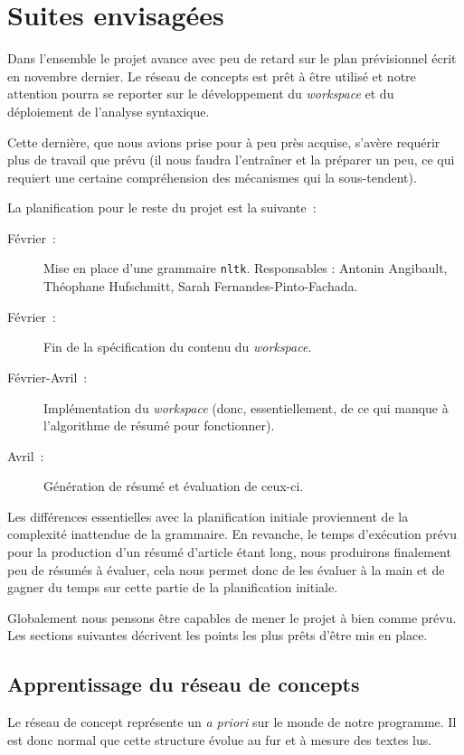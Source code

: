 \documentclass[a4paper,12pt]{article}
\newcommand{\pyt}[1]{\texttt{#1}}
\begin{document}
\section{Suites envisag\'ees}

Dans l'ensemble le projet avance avec peu de retard sur le plan prévisionnel écrit en novembre dernier. Le réseau de concepts est prêt à être utilisé et notre attention pourra se reporter sur le développement du \textit{workspace} et du déploiement de l'analyse syntaxique.

Cette dernière, que nous avions prise pour à peu près acquise, s'avère requérir plus de travail que prévu (il nous faudra l'entraîner et la préparer un peu, ce qui requiert une certaine compréhension des mécanismes qui la sous-tendent).

La planification pour le reste du projet est la suivante~:
\begin{description}
	\item[Février~: ]Mise en place d'une grammaire \pyt{nltk}. Responsables : Antonin Angibault, Théophane Hufschmitt, Sarah Fernandes-Pinto-Fachada.
	\item[Février~: ]Fin de la spécification du contenu du \textit{workspace}.
	\item[Février-Avril~: ]Implémentation du \textit{workspace} (donc, essentiellement, de ce qui manque à l'algorithme de résumé pour fonctionner).
	\item[Avril~: ]Génération de résumé et évaluation de ceux-ci.
\end{description}

Les différences essentielles avec la planification initiale proviennent de la complexité inattendue de la grammaire. En revanche, le temps d'exécution prévu pour la production d'un résumé d'article étant long, nous produirons finalement peu de résumés à évaluer, cela nous permet donc de les évaluer à la main et de gagner du temps sur cette partie de la planification initiale.

Globalement nous pensons être capables de mener le projet à bien comme prévu. Les sections suivantes décrivent les points les plus prêts d'être mis en place.

\subsection{Apprentissage du réseau de concepts}
Le réseau de concept représente un \textit{a priori} sur le monde de notre programme. Il est donc normal que cette structure évolue au fur et à mesure des textes lus. 
\end{document}
